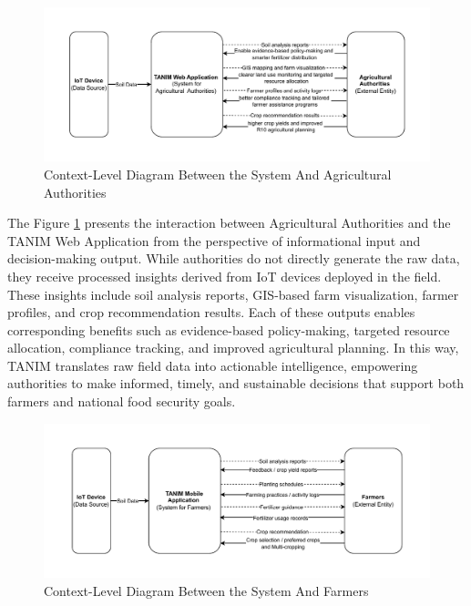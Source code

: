 {	\begin{figure}[H]
		\centering
		\caption{Context-Level Diagram Between the System And Agricultural Authorities}
		\label{fig:CLDSystem&AgriAuthorities}
		\includegraphics[width=1\textwidth]{figures/cldWEB.pdf}
	\end{figure}
	
	The Figure \ref{fig:CLDSystem&AgriAuthorities} presents the interaction between Agricultural Authorities and the TANIM Web 	Application from the perspective of informational input and decision-making output. While authorities do not directly generate the raw data, they receive processed insights derived from IoT devices deployed in the field. These insights include soil analysis reports, GIS-based farm visualization, farmer profiles, and crop recommendation results. Each of these outputs enables corresponding benefits such as evidence-based policy-making, targeted resource allocation, compliance tracking, and improved agricultural planning. In this way, TANIM translates raw field data into actionable intelligence, empowering authorities to make informed, timely, and sustainable decisions that support both farmers and national food security goals.
	
	\begin{figure}[H]
		\centering
		\caption{Context-Level Diagram Between the System And Farmers}
		\label{fig:CLDSystem&Farmers}
		\includegraphics[width=1\textwidth]{figures/cldMOB.pdf}
	\end{figure}
	
}
